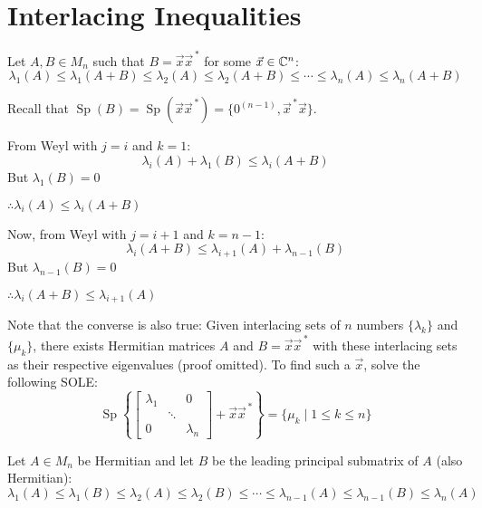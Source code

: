 \documentclass[letterpaper,12pt,fleqn]{article}
\newcommand{\vx}{\vec{x}}
\newcommand{\vxct}{\vx^{\,*}}
\renewcommand{\l}{\lambda}
\DeclareMathOperator{\Sp}{Sp}
\begin{document}
\section*{Interlacing Inequalities}

\begin{theorem}
  Let $A,B\in M_n$ such that $B=\vx\vxct$ for some $\vx\in\C^n$:
  \[\l_1(A)\le\l_1(A+B)\le\l_2(A)\le\l_2(A+B)\le\cdots\le\l_n(A)\le\l_n(A+B)\]
\end{theorem}

\begin{theproof}
  Recall that $\Sp(B)=\Sp(\vx\vxct)=\{0^{(n-1)},\vxct\vx\}$.
  
  From Weyl with $j=i$ and $k=1$:
  \[\l_i(A)+\l_1(B)\le\l_i(A+B)\]
  But $\l_1(B)=0$
  
  $\therefore\l_i(A)\le\l_i(A+B)$

  Now, from Weyl with $j=i+1$ and $k=n-1$:
  \[\l_i(A+B)\le\l_{i+1}(A)+\l_{n-1}(B)\]
  But $\l_{n-1}(B)=0$
  
  $\therefore\l_i(A+B)\le\l_{i+1}(A)$
\end{theproof}

Note that the converse is also true: Given interlacing sets of $n$ numbers $\{\l_k\}$ and
$\{\mu_k\}$, there exists Hermitian matrices $A$ and $B=\vx\vxct$ with these interlacing
sets as their respective eigenvalues (proof omitted). To find such a $\vx$, solve the
following SOLE:
\[\Sp\left\{\begin{bmatrix}\l_1 & & 0 \\
& \ddots & \\
0 & & \l_n
\end{bmatrix}+\vx\vxct\right\}=\{\mu_k\mid 1\le k\le n\}\]

\begin{theorem}
  Let $A\in M_n$ be Hermitian and let $B$ be the leading principal submatrix of $A$
  (also Hermitian):
  \[\l_1(A)\le\l_1(B)\le\l_2(A)\le\l_2(B)\le\cdots\le\l_{n-1}(A)\le\l_{n-1}(B)\le\l_n(A)\]
\end{theorem}
\end{document}
